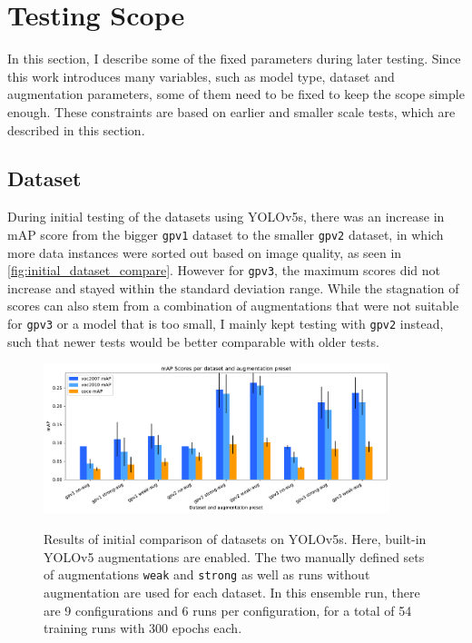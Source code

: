 \documentclass[10pt]{book}
\newcommand{\figureref}[1]{\autoref{#1}}
\begin{document}
\section{Testing Scope}

In this section, I describe some of the fixed parameters during later testing. Since this work introduces many variables, such as model type, dataset and augmentation parameters, some of them need to be fixed to keep the scope simple enough. These constraints are based on earlier and smaller scale tests, which are described in this section.

\subsection{Dataset}

During initial testing of the datasets using \ac{YOLO}v5s, there was an increase in \ac{mAP} score from the bigger \texttt{gpv1} dataset to the smaller \texttt{gpv2} dataset, in which more data instances were sorted out based on image quality, as seen in \figureref{fig:initial_dataset_compare}. However for \texttt{gpv3}, the maximum scores did not increase and stayed within the standard deviation range. While the stagnation of scores can also stem from a combination of augmentations that were not suitable for \texttt{gpv3} or a model that is too small, I mainly kept testing with \texttt{gpv2} instead, such that newer tests would be better comparable with older tests. 


\begin{figure}
  \caption{Results of initial comparison of datasets on \ac{YOLO}v5s. Here, built-in \ac{YOLO}v5 augmentations are enabled. The two manually defined sets of augmentations \texttt{weak} and \texttt{strong} as well as runs without augmentation are used for each dataset. In this ensemble run, there are 9 configurations and 6 runs per configuration, for a total of 54 training runs with 300 epochs each.}
  \includegraphics[width=0.9\textwidth]{image/gp-compare-v2-thesis}
  \label{fig:initial_dataset_compare}
\end{figure}
\end{document}
